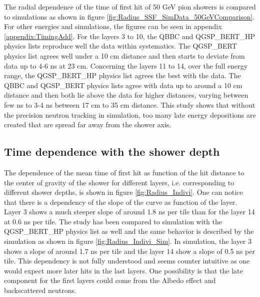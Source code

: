 The radial dependence of the time of first hit of 50 GeV pion showers is compared to simulations as shown in figure \ref{fig:Radius_SSF_SimData_50GeVComparison}. For other energies and simulations, the figures can be seen in appendix \ref{appendix:TimingAdd}. For the layers 3 to 10, the QBBC and QGSP\_BERT\_HP physics lists reproduce well the data within systematics. The QGSP\_BERT physics list agrees well under a 10 cm distance and then starts to deviate from data up to 4-6 ns at 23 cm. Concerning the layers 11 to 14, over the full energy range, the QGSP\_BERT\_HP physics list agrees the best with the data. The QBBC and QGSP\_BERT physics lists agree with data up to around a 10 cm distance and then both lie above the data for higher distances, varying between few ns to 3-4 ns between 17 cm to 35 cm distance. This study shows that without the precision neutron tracking in simulation, too many late energy depositions are created that are spread far away from the shower axis.

\subsection{Time dependence with the shower depth}
\label{sec:TimeRadiusDepth}

The dependence of the mean time of first hit as function of the hit distance to the center of gravity of the shower for different layers, i.e. corresponding to different shower depths, is shown in figure \ref{fig:Radius_Indivi}. One can notice that there is a dependency of the slope of the curve as function of the layer. Layer 3 shows a much steeper slope of around 1.8 ns per tile than for the layer 14 at 0.6 ns per tile. The study has been compared to simulation with the QGSP\_BERT\_HP physics list as well and the same behavior is described by the simulation as shown in figure \ref{fig:Radius_Indivi_Sim}. In simulation, the layer 3 shows a slope of around 1.7 ns per tile and the layer 14 show a slope of 0.5 ns per tile. This dependency is not fully understood and seems counter intuitive as one would expect more later hits in the last layers. One possibility is that the late component for the first layers could come from the Albedo effect \cite{ELLSWORTH1982167} and backscattered neutrons.

